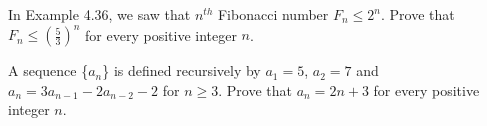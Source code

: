\documentclass{homework}
\begin{document}
\question In Example 4.36, we saw that $n^{th}$ Fibonacci number $F_{n} \leq 2^{n}$. Prove that $F_{n}\leq (\frac{5}{3})^{n}$ for every positive integer $n$.


\question A sequence \{$a_{n}$\} is defined recursively by $a_{1} = 5$, $a_{2} = 7$ and ${a_{n} = 3a_{n-1}-2a_{n-2}-2}$ for $n\geq3$. Prove that $a_{n} = 2n + 3$ for every positive integer $n$.

\end{document}
